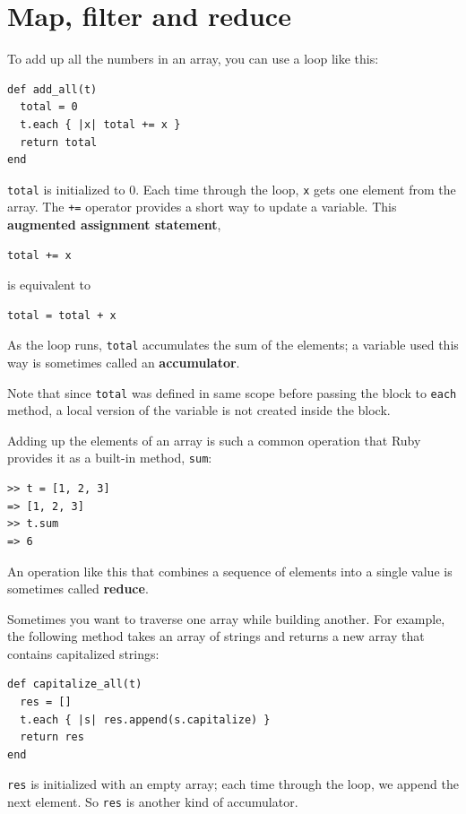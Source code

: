 \documentclass[10pt]{book}
\begin{document}
\section{Map, filter and reduce}
\label{filter}

To add up all the numbers in an array, you can use a loop like this:


\begin{verbatim}
def add_all(t)
  total = 0
  t.each { |x| total += x }
  return total
end
\end{verbatim}
%
{\tt total} is initialized to 0.  Each time through the loop,
{\tt x} gets one element from the array.  The {\tt +=} operator
provides a short way to update a variable.  This 
{\bf augmented assignment statement},

\begin{verbatim}
total += x
\end{verbatim}
%
is equivalent to

\begin{verbatim}
total = total + x
\end{verbatim}
%
As the loop runs, {\tt total} accumulates the sum of the
elements; a variable used this way is sometimes called an
{\bf accumulator}.

Note that since {\tt total} was defined in same scope before
passing the block to {\tt each} method, a local version of the
variable is not created inside the block.

Adding up the elements of an array is such a common operation
that Ruby provides it as a built-in method, {\tt sum}:

\begin{verbatim}
>> t = [1, 2, 3]
=> [1, 2, 3]
>> t.sum
=> 6
\end{verbatim}
%
An operation like this that combines a sequence of elements into
a single value is sometimes called {\bf reduce}.

Sometimes you want to traverse one array while building
another.  For example, the following method takes an array of strings
and returns a new array that contains capitalized strings:

\begin{verbatim}
def capitalize_all(t)
  res = []
  t.each { |s| res.append(s.capitalize) }
  return res
end
\end{verbatim}
%
{\tt res} is initialized with an empty array; each time through
the loop, we append the next element.  So {\tt res} is another
kind of accumulator.
\end{document}
